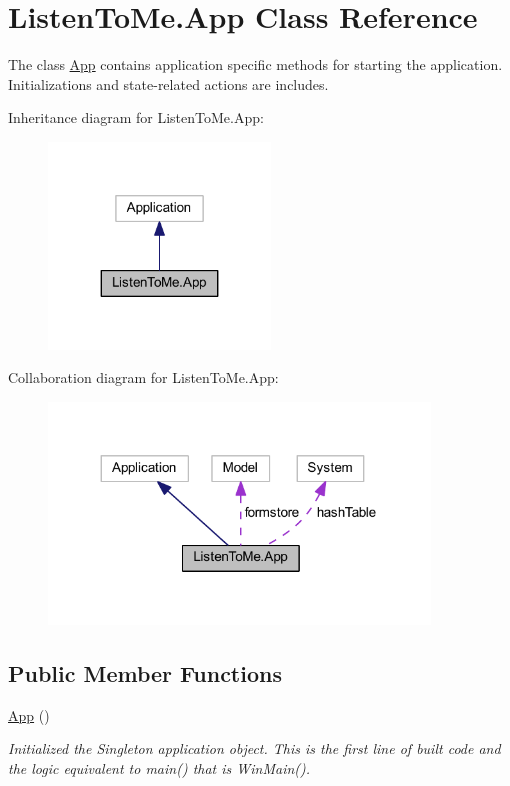 \hypertarget{class_listen_to_me_1_1_app}{}\section{Listen\+To\+Me.\+App Class Reference}
\label{class_listen_to_me_1_1_app}


The class \hyperlink{class_listen_to_me_1_1_app}{App} contains application specific methods for starting the application. Initializations and state-\/related actions are includes.  




Inheritance diagram for Listen\+To\+Me.\+App\+:
\nopagebreak
\begin{figure}[H]
\begin{center}
\leavevmode
\includegraphics[width=167pt]{class_listen_to_me_1_1_app__inherit__graph}
\end{center}
\end{figure}


Collaboration diagram for Listen\+To\+Me.\+App\+:
\nopagebreak
\begin{figure}[H]
\begin{center}
\leavevmode
\includegraphics[width=287pt]{class_listen_to_me_1_1_app__coll__graph}
\end{center}
\end{figure}
\subsection*{Public Member Functions}
\begin{DoxyCompactItemize}
\item 
\hyperlink{class_listen_to_me_1_1_app_a8b865aa5eb8e0a1333c2b29f41bf4aa1}{App} ()
\begin{DoxyCompactList}\small\item\em Initialized the Singleton application object. This is the first line of built code and the logic equivalent to main() that is Win\+Main(). \end{DoxyCompactList}\end{DoxyCompactItemize}
